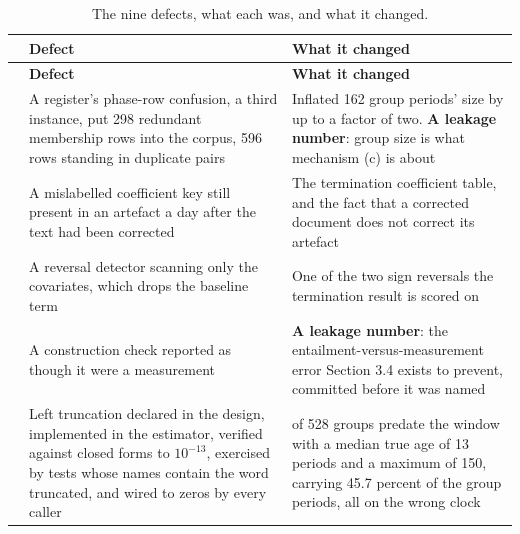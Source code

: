 \documentclass[twoside,11pt]{article}
\begin{document}
\begingroup\small
\begin{longtable}{@{}
  >{\raggedright\arraybackslash}p{}
  >{\raggedright\arraybackslash}p{}
  >{\raggedright\arraybackslash}p{}@{}}
\caption{The nine defects, what each was, and what it changed.}\label{tab:C-1}\\
\toprule
\begin{minipage}[b]{\linewidth}\raggedright
\end{minipage} & \begin{minipage}[b]{\linewidth}\raggedright
\textbf{Defect}
\end{minipage} & \begin{minipage}[b]{\linewidth}\raggedright
\textbf{What it changed}
\end{minipage} \\
\midrule
\endfirsthead
\toprule
\begin{minipage}[b]{\linewidth}\raggedright
\end{minipage} & \begin{minipage}[b]{\linewidth}\raggedright
\textbf{Defect}
\end{minipage} & \begin{minipage}[b]{\linewidth}\raggedright
\textbf{What it changed}
\end{minipage} \\
\midrule
\endhead
\bottomrule
\endlastfoot
1 & A register's phase-row confusion, a third instance, put 298 redundant membership rows into the corpus, 596 rows standing in duplicate pairs & Inflated 162 group periods' size by up to a factor of two. \textbf{A leakage number}: group size is what mechanism (c) is about \\
2 & A mislabelled coefficient key still present in an artefact a day after the text had been corrected & The termination coefficient table, and the fact that a corrected document does not correct its artefact \\
3 & A reversal detector scanning only the covariates, which drops the baseline term & One of the two sign reversals the termination result is scored on \\
4 & A construction check reported as though it were a measurement & \textbf{A leakage number}: the entailment-versus-measurement error Section 3.4 exists to prevent, committed before it was named \\
5 & Left truncation declared in the design, implemented in the estimator, verified against closed forms to \(10^{- 13}\), exercised by tests whose names contain the word truncated, and wired to zeros by every caller & 183 of 528 groups predate the window with a median true age of 13 periods and a maximum of 150, carrying 45.7 percent of the group periods, all on the wrong clock \\

\end{longtable}
\end{document}
